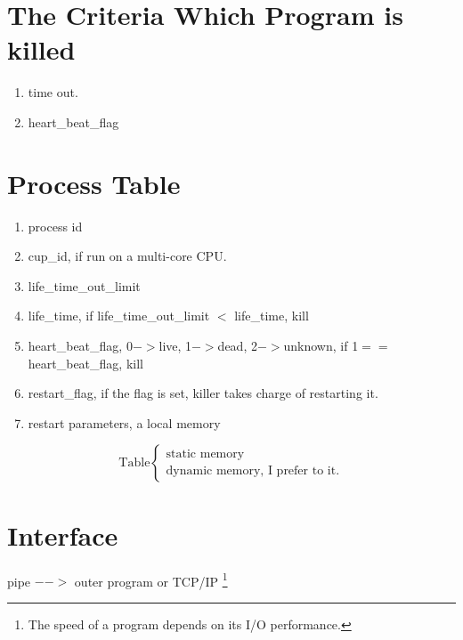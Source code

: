 \section{The Criteria Which Program is killed}
\begin{enumerate}
\item time out.
\item heart\_beat\_flag
\end{enumerate}

\section{Process Table}
\begin{enumerate}
\item process id
\item cup\_id, if run on a multi-core CPU.
\item life\_time\_out\_limit
\item life\_time, if life\_time\_out\_limit $<$ life\_time, kill
\item heart\_beat\_flag, 0$->$live, 1$->$dead, 2$->$unknown, if 1$==$ heart\_beat\_flag, kill
\item restart\_flag, if the flag is set, killer takes charge of restarting it.
\item restart parameters, a local memory 
\end{enumerate}

$$
\text{Table} 
\begin{cases}
\text{static memory}\\
\text{dynamic memory, I prefer to it.}
\end{cases}
$$

\section{Interface}
pipe $-->$ outer program or TCP/IP \footnote{The speed of a program depends on its I/O performance. }


